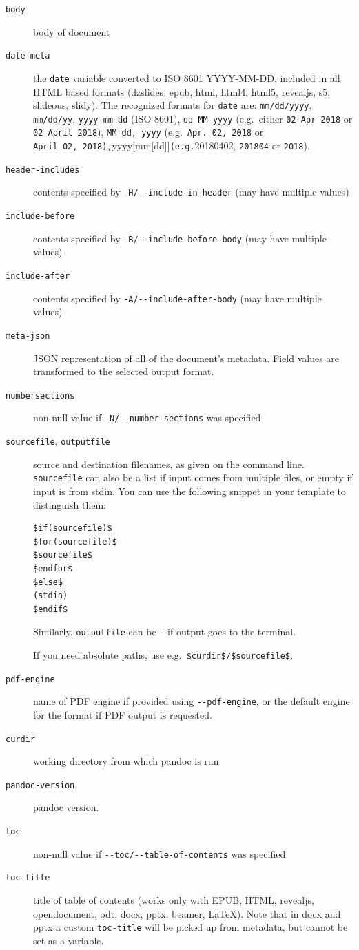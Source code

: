 \documentclass[
]{article}
\begin{document}
\begin{description}
\item[\texttt{body}]
body of document
\item[\texttt{date-meta}]
the \texttt{date} variable converted to ISO 8601 YYYY-MM-DD, included in
all HTML based formats (dzslides, epub, html, html4, html5, revealjs,
s5, slideous, slidy). The recognized formats for \texttt{date} are:
\texttt{mm/dd/yyyy}, \texttt{mm/dd/yy}, \texttt{yyyy-mm-dd} (ISO 8601),
\texttt{dd\ MM\ yyyy} (e.g.~either \texttt{02\ Apr\ 2018} or
\texttt{02\ April\ 2018}), \texttt{MM\ dd,\ yyyy}
(e.g.~\texttt{Apr.\ 02,\ 2018} or
\texttt{April\ 02,\ 2018),}yyyy{[}mm{[}dd{]}{]}\texttt{(e.g.}20180402,
\texttt{201804} or \texttt{2018}).
\item[\texttt{header-includes}]
contents specified by \texttt{-H/-\/-include-in-header} (may have
multiple values)
\item[\texttt{include-before}]
contents specified by \texttt{-B/-\/-include-before-body} (may have
multiple values)
\item[\texttt{include-after}]
contents specified by \texttt{-A/-\/-include-after-body} (may have
multiple values)
\item[\texttt{meta-json}]
JSON representation of all of the document's metadata. Field values are
transformed to the selected output format.
\item[\texttt{numbersections}]
non-null value if \texttt{-N/-\/-number-sections} was specified
\item[\texttt{sourcefile}, \texttt{outputfile}]
source and destination filenames, as given on the command line.
\texttt{sourcefile} can also be a list if input comes from multiple
files, or empty if input is from stdin. You can use the following
snippet in your template to distinguish them:

\begin{verbatim}
$if(sourcefile)$
$for(sourcefile)$
$sourcefile$
$endfor$
$else$
(stdin)
$endif$
\end{verbatim}

Similarly, \texttt{outputfile} can be \texttt{-} if output goes to the
terminal.

If you need absolute paths, use e.g.~\texttt{\$curdir\$/\$sourcefile\$}.
\item[\texttt{pdf-engine}]
name of PDF engine if provided using \texttt{-\/-pdf-engine}, or the
default engine for the format if PDF output is requested.
\item[\texttt{curdir}]
working directory from which pandoc is run.
\item[\texttt{pandoc-version}]
pandoc version.
\item[\texttt{toc}]
non-null value if \texttt{-\/-toc/-\/-table-of-contents} was specified
\item[\texttt{toc-title}]
title of table of contents (works only with EPUB, HTML, revealjs,
opendocument, odt, docx, pptx, beamer, LaTeX). Note that in docx and
pptx a custom \texttt{toc-title} will be picked up from metadata, but
cannot be set as a variable.
\end{description}
\end{document}
